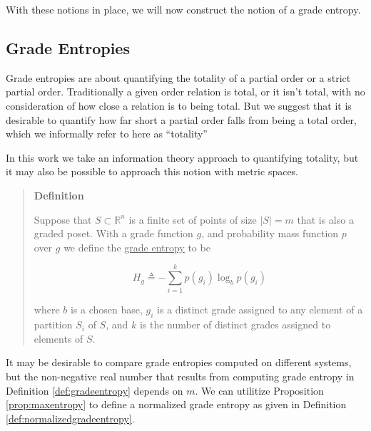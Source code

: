 \documentclass[
  letterpaper,
  DIV=11,
  numbers=noendperiod]{scrreprt}
\begin{document}
With these notions in place, we will now construct the notion of a grade
entropy.

\subsection{Grade Entropies}\label{grade-entropies-1}

Grade entropies are about quantifying the totality of a partial order or
a strict partial order. Traditionally a given order relation is total,
or it isn't total, with no consideration of how close a relation is to
being total. But we suggest that it is desirable to quantify how far
short a partial order falls from being a total order, which we
informally refer to here as ``totality''

\begin{tcolorbox}[enhanced jigsaw, colbacktitle=quarto-callout-note-color!10!white, bottomrule=.15mm, left=2mm, arc=.35mm, bottomtitle=1mm, coltitle=black, breakable, rightrule=.15mm, toptitle=1mm, opacityback=0, titlerule=0mm, title=\textcolor{quarto-callout-note-color}{\faInfo}\hspace{0.5em}{Note}, colframe=quarto-callout-note-color-frame, toprule=.15mm, leftrule=.75mm, opacitybacktitle=0.6, colback=white]

In this work we take an information theory approach to quantifying
totality, but it may also be possible to approach this notion with
metric spaces.

\end{tcolorbox}

\begin{quote}
\textbf{Definition}

Suppose that \(S \subset   \mathbb{R}^n\) is a finite set of points of
size \(|S|=m\) that is also a graded poset. With a grade function \(g\),
and probability mass function \(p\) over \(g\) we define the
\underline{grade entropy} to be

\[H_g \triangleq - \sum_{i=1}^{k} p(g_i)  \log_b  p(g_i) \]

where \(b\) is a chosen base, \(g_i\) is a distinct grade assigned to
any element of a partition \(S_i\) of \(S\), and \(k\) is the number of
distinct grades assigned to elements of \(S\).
\end{quote}

It may be desirable to compare grade entropies computed on different
systems, but the non-negative real number that results from computing
grade entropy in Definition \ref{def:gradeentropy} depends on \(m\). We
can utilitize Proposition \ref{prop:maxentropy} to define a normalized
grade entropy as given in Definition \ref{def:normalizedgradeentropy}.
\end{document}
